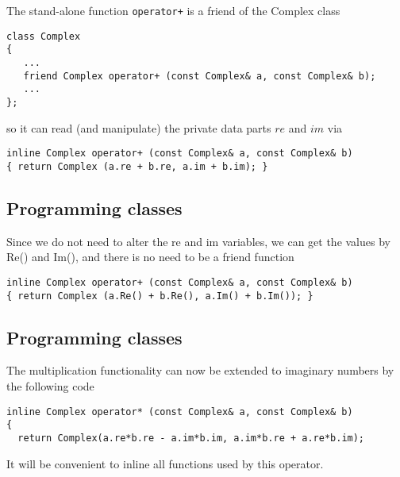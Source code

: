 \documentclass[%
oneside,                 %
final,                   %
10pt]{article}
\begin{document}
The stand-alone function \Verb!operator+! is a friend of the Complex  class

\begin{verbatim}
class Complex
{
   ...
   friend Complex operator+ (const Complex& a, const Complex& b);
   ...
};
\end{verbatim}
so it can read (and manipulate) the private data parts $re$ and
$im$ via

\begin{verbatim}
inline Complex operator+ (const Complex& a, const Complex& b)
{ return Complex (a.re + b.re, a.im + b.im); }
\end{verbatim}

\subsection*{Programming classes}

Since we do not need to alter the re and im variables, we can
get the values by Re() and Im(), and there is no need to be a
friend function

\begin{verbatim}
inline Complex operator+ (const Complex& a, const Complex& b)
{ return Complex (a.Re() + b.Re(), a.Im() + b.Im()); }
\end{verbatim}

\subsection*{Programming classes}

The multiplication functionality can now be extended to imaginary numbers by the following code

\begin{verbatim}
inline Complex operator* (const Complex& a, const Complex& b)
{
  return Complex(a.re*b.re - a.im*b.im, a.im*b.re + a.re*b.im);

\end{verbatim}
It will be convenient to inline all functions used by this operator.

\end{document}
